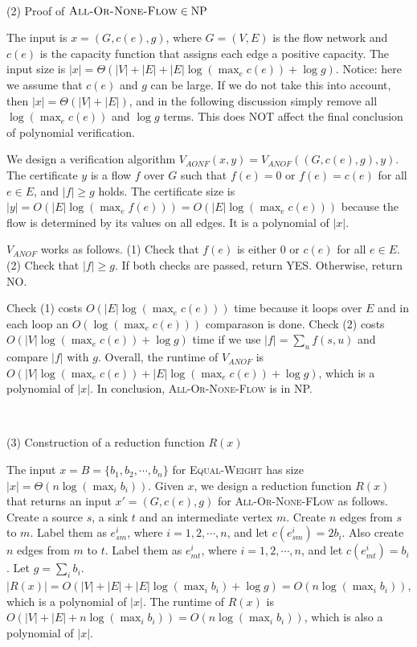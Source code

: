 \documentclass{article}
\begin{document}
~

\noindent(2) Proof of $\textsc{All-Or-None-Flow}\in\textup{NP}$

The input is $x=(G,c(e),g)$, where $G=(V,E)$ is the flow network and $c(e)$ is the capacity function that assigns each edge a positive capacity. The input size is $|x|=\Theta(|V|+|E|+|E|\log(\max_ec(e))+\log g)$. Notice: here we assume that $c(e)$ and $g$ can be large. If we do not take this into account, then $|x|=\Theta(|V|+|E|)$, and in the following discussion simply remove all $\log(\max_ec(e))$ and $\log g$ terms. This does NOT affect the final conclusion of polynomial verification.

We design a verification algorithm $V_{AONF}(x,y)=V_{ANOF}((G,c(e),g),y)$. The certificate $y$ is a flow $f$ over $G$ such that $f(e)=0$ or $f(e)=c(e)$ for all $e\in E$, and $|f|\geqslant g$ holds. The certificate size is $|y|=O(|E|\log(\max_ef(e)))=O(|E|\log(\max_ec(e)))$ because the flow is determined by its values on all edges. It is a polynomial of $|x|$.

$V_{ANOF}$ works as follows. (1) Check that $f(e)$ is either 0 or $c(e)$ for all $e\in E$. (2) Check that $|f|\geqslant g$. If both checks are passed, return YES. Otherwise, return NO.

Check (1) costs $O(|E|\log(\max_ec(e)))$ time because it loops over $E$ and in each loop an $O(\log(\max_ec(e)))$ comparason is done. Check (2) costs $O(|V|\log(\max_ec(e))+\log g)$ time if we use $|f|=\sum_uf(s,u)$ and compare $|f|$ with $g$. Overall, the runtime of $V_{ANOF}$ is $O(|V|\log(\max_ec(e))+|E|\log(\max_ec(e))+\log g)$, which is a polynomial of $|x|$. In conclusion, \textsc{All-Or-None-Flow} is in NP.

~

\noindent(3) Construction of a reduction function $R(x)$

The input $x=B=\{b_1,b_2,\cdots,b_n\}$ for \textsc{Equal-Weight} has size $|x|=\Theta(n\log(\max_ib_i))$. Given $x$, we design a reduction function $R(x)$ that returns an input $x'=(G,c(e),g)$ for \textsc{All-Or-None-FLow} as follows. Create a source $s$, a sink $t$ and an intermediate vertex $m$. Create $n$ edges from $s$ to $m$. Label them as $e_{sm}^i$, where $i=1,2,\cdots,n$, and let $c(e_{sm}^i)=2b_i$. Also create $n$ edges from $m$ to $t$. Label them as $e_{mt}^i$, where $i=1,2,\cdots,n$, and let $c(e_{mt}^i)=b_i$. Let $g=\sum_ib_i$. $|R(x)|=O(|V|+|E|+|E|\log(\max_ib_i)+\log g)=O(n\log(\max_ib_i))$, which is a polynomial of $|x|$. The runtime of $R(x)$ is $O(|V|+|E|+n\log(\max_ib_i))=O(n\log(\max_ib_i))$, which is also a polynomial of $|x|$.
\end{document}

